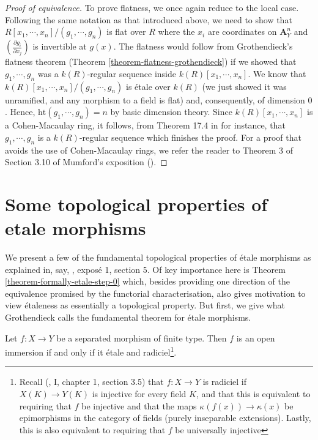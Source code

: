 \begin{proof}[Proof of equivalence]
\medskip\noindent
To prove flatness, we once again reduce to the local case. Following the
same notation as that introduced above, we need to show that
$R[x_1,\cdots,x_n]/(g_1,\cdots,g_n)$ is flat over $R$ where the $x_i$ are
coordinates on $\mathbf{A}^n_Y$ and $(\frac{\partial g_i}{\partial x_j})$ is
invertible at $g(x)$. The flatness would follow from Grothendieck's flatness
theorem (Theorem \ref{theorem-flatness-grothendieck}) if we showed that
$g_1,\cdots,g_n$ was a $k(R)$-regular sequence inside
$k(R)[x_1,\cdots,x_n]$. We know that $k(R)[x_1,\cdots,x_n]/(g_1,\cdots,g_n)$
is \'etale over $k(R)$ (we just showed it was unramified, and any morphism to
a field is flat) and, consequently, of dimension $0$. Hence,
$\mathrm{ht}(g_1,\cdots,g_n) = n$ by basic dimension theory. Since
$k(R)[x_1,\cdots,x_n]$ is a Cohen-Macaulay ring, it follows, from Theorem
17.4 in \cite{Ma} for instance, that $g_1,\cdots,g_n$ is a $k(R)$-regular
sequence which finishes the proof. For a proof that avoids the use of
Cohen-Macaulay rings, we refer the reader to Theorem 3 of Section 3.10 of
Mumford's exposition (\cite{RB}).
\end{proof}

\section{Some topological properties of etale morphisms}
\label{section-topological-etale}

\noindent
We present a few of the fundamental topological properties of \'etale
morphisms as explained in, say, \cite{SGA1}, expos\'e 1, section 5. Of key
importance here is Theorem \ref{theorem-formally-etale-step-0} which, besides
providing one direction of the equivalence promised by the functorial
characterisation, also gives motivation to view \'etaleness as essentially
a topological property. But first, we give what Grothendieck calls the
fundamental theorem for \'etale morphisms.

\begin{theorem}
\label{theorem-etale-radiciel-open}
Let $f:X \to Y$ be a separated morphism of finite type. Then $f$ is an open
immersion if and only if it \'etale and
radiciel\footnote{Recall (\cite{EGA}, I, chapter 1, section 3.5) that
$f:X \to Y$ is radiciel if $X(K) \to Y(K)$ is injective for every field $K$,
and that this is equivalent to requiring that $f$ be injective and that the
maps $\kappa(f(x)) \to \kappa(x)$ be epimorphisms in the category of fields
(purely inseparable extensions). Lastly, this is also equivalent to requiring
that $f$ be universally injective}.
\end{theorem}

